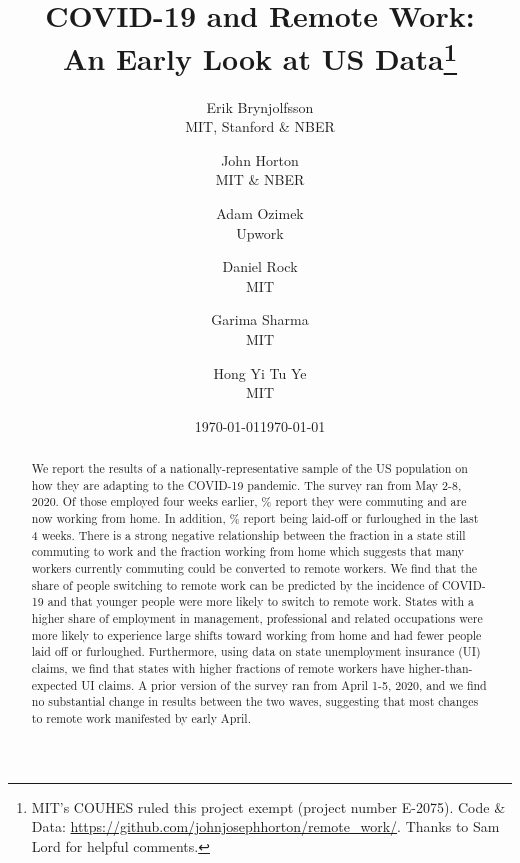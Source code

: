 \documentclass[12pt]{article}
\newcommand{\covid}{COVID-19}
\begin{document}
 



\title{COVID-19 and Remote Work:\\ An Early Look at US Data\footnote{
    MIT's COUHES ruled this project exempt (project number E-2075).
    {Code \& Data: \href{https://github.com/johnjosephhorton/remote\_work/}{https://github.com/johnjosephhorton/remote\_work/}}.
    Thanks to Sam Lord for helpful comments. 
  }}

\date{\today}

\date{\today}

\author{Erik Brynjolfsson\\MIT, Stanford \& NBER \and John Horton\\MIT \& NBER \and Adam Ozimek\\Upwork \and Daniel Rock\\MIT \and Garima Sharma\\MIT \and Hong Yi Tu Ye\\MIT}


\maketitle

\begin{abstract}
  \noindent 
  We report the results of a nationally-representative sample of the US population on how they are adapting to the \covid{} pandemic.
  The survey ran from May 2-8, 2020.
  Of those employed four weeks earlier, \WFH{}\% report they were commuting and are now working from home.
  In addition, \LaidOff{}\% report being laid-off or furloughed in the last 4 weeks.   
  There is a strong negative relationship between the fraction in a state still commuting to work and the fraction working from home which suggests that many workers currently commuting could be converted to remote workers.  We find that the share of people switching to remote work can be predicted  by the incidence of \covid{} and that younger people were more likely to switch to remote work.  States with a higher share of employment in management, professional and related occupations were more likely to experience large shifts toward working from home and had fewer people laid off or furloughed.
  Furthermore, using data on state unemployment insurance (UI) claims, we find that states with higher fractions of remote workers have higher-than-expected UI claims. A prior version of the survey ran from April 1-5, 2020, and we find no substantial change in results between the two waves, suggesting that most changes to remote work manifested by early April.
  \newline 
\end{abstract} 
\end{document}
